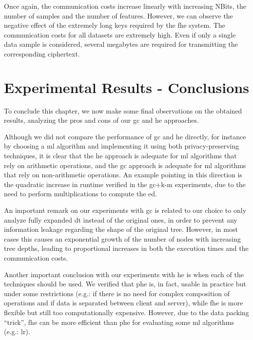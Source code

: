 Once again, the communication costs increase linearly with increasing NBits, the number of samples and the number of features. However, we can observe the negative effect of the extremely long keys required by the \ac{fhe} system. The communication costs for all datasets are extremely high. Even if only a single data sample is considered, several megabytes are required for transmitting the corresponding ciphertext.



\section{Experimental Results - Conclusions}
\label{sec:ExperimentalResultsConclusion}


To conclude this chapter, we now make some final observations on the obtained results, analyzing the pros and cons of our \ac{gc} and \ac{he} approaches.

Although we did not compare the performance of \ac{gc} and \ac{he} directly, for instance by choosing a \ac{ml} algorithm and implementing it using both privacy-preserving techniques, it is clear that the \ac{he} approach is adequate for \ac{ml} algorithms that rely on arithmetic operations, and the \ac{gc} approach is adequate for \ac{ml} algorithms that rely on non-arithmetic operations. An example pointing in this direction is the quadratic increase in runtime verified in the \ac{gc}+\ac{k-m} experiments, due to the need to perform multiplications to compute the \ac{ed}.

An important remark on our experiments with \ac{gc} is related to our choice to only analyze fully expanded \ac{dt} instead of the original ones, in order to prevent any information leakage regarding the shape of the original tree. However, in most cases this causes an exponential growth of the number of nodes with increasing tree depths, leading to proportional increases in both the execution times and the communication costs.
  

Another important conclusion with our experiments with \ac{he} is when each of the techniques should be used. We verified that \ac{phe} is, in fact, usable in practice but under some restrictions (e.g.: if there is no need for complex composition of operations and if data is separated between client and server), while \ac{fhe} is more flexible but still too computationally expensive. However, due to the data packing ``trick'', \ac{fhe} can be more efficient than \ac{phe} for evaluating some \ac{ml} algorithms (e.g.: \ac{lr}).



